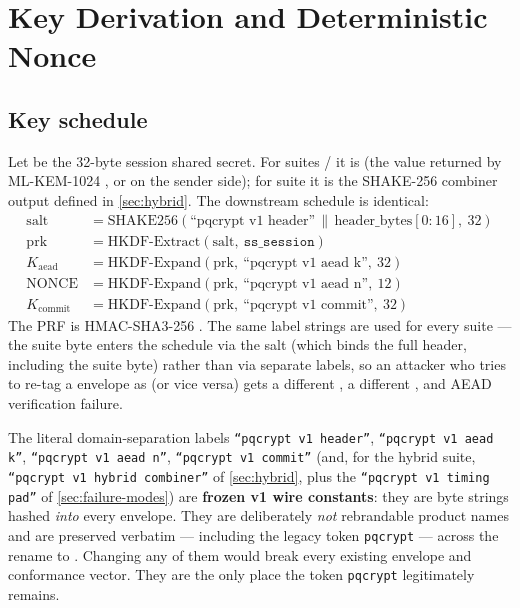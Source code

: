 \section{Key Derivation and Deterministic Nonce}
\label{sec:kdf-nonce}

\subsection{Key schedule}

Let  be the 32-byte session shared secret. For suites / it is  (the value returned by ML-KEM-1024 , or  on the sender side); for suite  it is the SHAKE-256 combiner output defined in \cref{sec:hybrid}. The downstream schedule is identical:
\begin{align*}
\mathrm{salt} &= \mathrm{SHAKE256}(\text{``pqcrypt v1 header''} \,\|\, \mathrm{header\_bytes}[0\!:\!16],\ 32) \\
\mathrm{prk}  &= \mathrm{HKDF\text{-}Extract}(\mathrm{salt},\ \texttt{ss\_session}) \\
K_{\mathrm{aead}}   &= \mathrm{HKDF\text{-}Expand}(\mathrm{prk},\ \text{``pqcrypt v1 aead k''},\ 32) \\
\mathrm{NONCE}      &= \mathrm{HKDF\text{-}Expand}(\mathrm{prk},\ \text{``pqcrypt v1 aead n''},\ 12) \\
K_{\mathrm{commit}} &= \mathrm{HKDF\text{-}Expand}(\mathrm{prk},\ \text{``pqcrypt v1 commit''},\ 32)
\end{align*}
The PRF is HMAC-SHA3-256 \citep{fips202}. The same label strings are used for every suite --- the suite byte enters the schedule via the salt (which binds the full header, including the suite byte) rather than via separate labels, so an attacker who tries to re-tag a  envelope as  (or vice versa) gets a different , a different , and AEAD verification failure.

\begin{calloutwarning}
The literal domain-separation labels \texttt{``pqcrypt v1 header''}, \texttt{``pqcrypt v1 aead k''}, \texttt{``pqcrypt v1 aead n''}, \texttt{``pqcrypt v1 commit''} (and, for the hybrid suite, \texttt{``pqcrypt v1 hybrid combiner''} of \cref{sec:hybrid}, plus the \texttt{``pqcrypt v1 timing pad''} of \cref{sec:failure-modes}) are \textbf{frozen v1 wire constants}: they are byte strings hashed \emph{into} every envelope. They are deliberately \emph{not} rebrandable product names and are preserved verbatim --- including the legacy token \texttt{pqcrypt} --- across the rename to \pqcrypt{}. Changing any of them would break every existing envelope and conformance vector. They are the only place the token \texttt{pqcrypt} legitimately remains.
\end{calloutwarning}

